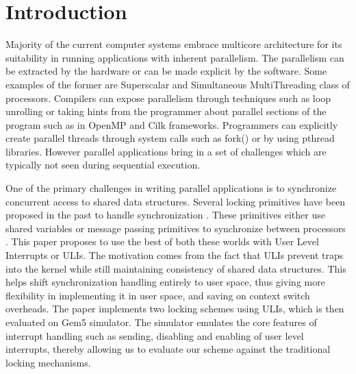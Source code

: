 \section{Introduction}
Majority of the current computer systems embrace multicore architecture for its
suitability in running applications with inherent parallelism.
The parallelism can be extracted by the hardware or can be made explicit by the
software. Some examples of the former are Superscalar and Simultaneous
MultiThreading class of processors. Compilers can expose parallelism through
techniques such as loop unrolling or taking hints from the programmer about
parallel sections of the program such as in OpenMP and Cilk frameworks.
Programmers can explicitly create parallel threads through system calls such as
fork() or by using pthread libraries. However parallel applications bring
in a set of challenges which are typically not seen during sequential execution.

One of the primary challenges in writing parallel applications is to synchronize
concurrent access to shared data structures. Several locking primitives have
been proposed in the past to handle synchronization \cite{mellor-crummey}. These primitives either
use shared variables or message passing primitives to synchronize between
processors \cite{fatourou}. This paper proposes to use the best of both these worlds with User
Level Interrupts or ULIs. The motivation comes from the fact that ULIs prevent
traps into the kernel while still maintaining consistency of shared data
structures. This helps shift synchronization handling entirely to user space,
thus giving more flexibility in implementing it in user space,
and saving on context switch overheads. The paper implements two locking schemes
using ULIs, which is then evaluated on Gem5 simulator. The simulator emulates
the core features of interrupt handling such as sending, disabling and enabling
of user level interrupts, thereby allowing us to evaluate our scheme against the
traditional locking mechanisms.

